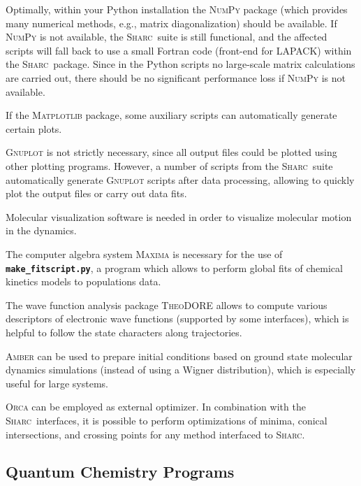 \documentclass[a4paper,10pt,DIV=15,openany,twoside=false]{scrbook}
\newcommand{\sharc}{\textsc{Sharc}}
\newcommand{\ttt}[1]{\textbf{\texttt{#1}}}
\begin{document}
Optimally, within your Python installation the \textsc{NumPy} package (which provides many numerical methods, e.g., matrix diagonalization) should be available. If \textsc{NumPy} is not available, the \sharc\ suite is still functional, and the affected scripts will fall back to use a small Fortran code (front-end for LAPACK) within the \sharc\ package. Since in the Python scripts no large-scale matrix calculations are carried out, there should be no significant performance loss if \textsc{NumPy} is not available.

If the \textsc{Matplotlib} package, some auxiliary scripts can automatically generate certain plots.

\textsc{Gnuplot} is not strictly necessary, since all output files could be plotted using other plotting programs. However, a number of scripts from the \sharc\ suite automatically generate \textsc{Gnuplot} scripts after data processing, allowing to quickly plot the output files or carry out data fits.

Molecular visualization software is needed in order to visualize molecular motion in the dynamics.

The computer algebra system \textsc{Maxima} is necessary for the use of \ttt{make\_fitscript.py}, a program which allows to perform global fits of chemical kinetics models to populations data.

The wave function analysis package \textsc{TheoDORE} allows to compute various descriptors of electronic wave functions (supported by some interfaces), which is helpful to follow the state characters along trajectories.

\textsc{Amber} can be used to prepare initial conditions based on ground state molecular dynamics simulations (instead of using a Wigner distribution), which is especially useful for large systems.

\textsc{Orca} can be employed as external optimizer. In combination with the \sharc\ interfaces, it is possible to perform optimizations of minima, conical intersections, and crossing points for any method interfaced to \sharc.

\subsection{Quantum Chemistry Programs}
\end{document}
